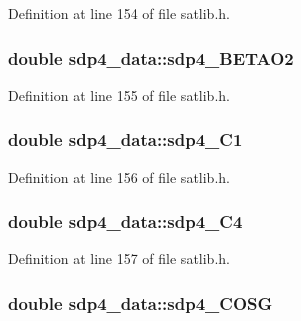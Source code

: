 Definition at line 154 of file satlib.\-h.

\hypertarget{structsdp4__data_a762d0086b20cf47ac525795bcc1fcf83}{
\subsubsection[{sdp4\-\_\-\-B\-E\-T\-A\-O2}]{\setlength{\rightskip}{0pt plus 5cm}double sdp4\-\_\-data\-::sdp4\-\_\-\-B\-E\-T\-A\-O2}}\label{structsdp4__data_a762d0086b20cf47ac525795bcc1fcf83}


Definition at line 155 of file satlib.\-h.

\hypertarget{structsdp4__data_a5313edbdab20b808c9a5e3826d1a2b4b}{
\subsubsection[{sdp4\-\_\-\-C1}]{\setlength{\rightskip}{0pt plus 5cm}double sdp4\-\_\-data\-::sdp4\-\_\-\-C1}}\label{structsdp4__data_a5313edbdab20b808c9a5e3826d1a2b4b}


Definition at line 156 of file satlib.\-h.

\hypertarget{structsdp4__data_a9c417b3f30e3ca928f74615a629dfe09}{
\subsubsection[{sdp4\-\_\-\-C4}]{\setlength{\rightskip}{0pt plus 5cm}double sdp4\-\_\-data\-::sdp4\-\_\-\-C4}}\label{structsdp4__data_a9c417b3f30e3ca928f74615a629dfe09}


Definition at line 157 of file satlib.\-h.

\hypertarget{structsdp4__data_a1fddbda1c938312a11e100c3d8e3154a}{
\subsubsection[{sdp4\-\_\-\-C\-O\-S\-G}]{\setlength{\rightskip}{0pt plus 5cm}double sdp4\-\_\-data\-::sdp4\-\_\-\-C\-O\-S\-G}}\label{structsdp4__data_a1fddbda1c938312a11e100c3d8e3154a}


